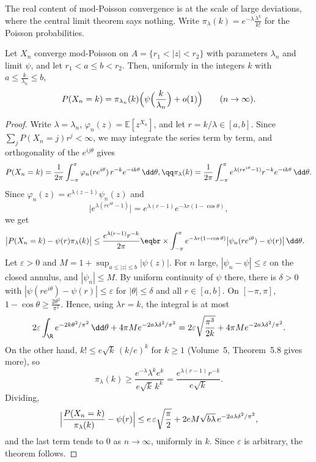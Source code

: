 The real content of mod-Poisson convergence is at the scale of large deviations, where the central limit theorem says nothing. Write $\pi_\lambda(k)=e^{-\lambda}\frac{\lambda^k}{k!}$ for the Poisson probabilities.

\begin{theorem}\label{thm:modpoissonlocal}
Let $X_n$ converge mod-Poisson on $A=\{r_1<|z|<r_2\}$ with parameters $\lambda_n$ and limit $\psi$, and let $r_1<a\le b<r_2$. Then, uniformly in the integers $k$ with $a\le\frac k{\lambda_n}\le b$,
\[
P(X_n=k)=\pi_{\lambda_n}(k)\Bigl(\psi\Bigl(\frac k{\lambda_n}\Bigr)+o(1)\Bigr)\qquad(n\to\infty).
\]
\end{theorem}
\begin{proof}
Write $\lambda=\lambda_n$, $\varphi_n(z)=\mathbb E[z^{X_n}]$, and let $r=k/\lambda\in[a,b]$. Since $\sum_jP(X_n=j)r^j<\infty$, we may integrate the series term by term, and orthogonality of the $e^{ij\theta}$ gives
\[
\begin{gathered}P(X_n=k)=\frac1{2\pi}\int_{-\pi}^\pi\varphi_n(re^{i\theta})\,r^{-k}e^{-ik\theta}\,\dd\theta,\qq\pi_\lambda(k)=\frac1{2\pi}\int_{-\pi}^\pi e^{\lambda(re^{i\theta}-1)}r^{-k}e^{-ik\theta}\,\dd\theta .\end{gathered}
\]
Since $\varphi_n(z)=e^{\lambda(z-1)}\psi_n(z)$ and
\[
\bigl|e^{\lambda(re^{i\theta}-1)}\bigr|=e^{\lambda(r-1)}e^{-\lambda r(1-\cos\theta)},
\]
we get
\[
\begin{aligned}\bigl|P(X_n=k)-\psi(r)\pi_\lambda(k)\bigr|&\le\frac{e^{\lambda(r-1)}r^{-k}}{2\pi}\eqbr\times\int_{-\pi}^\pi e^{-\lambda r(1-\cos\theta)}\bigl|\psi_n(re^{i\theta})-\psi(r)\bigr|\,\dd\theta .\end{aligned}
\]
Let $\varepsilon>0$ and $M=1+\sup_{a\le|z|\le b}|\psi(z)|$. For $n$ large, $|\psi_n-\psi|\le\varepsilon$ on the closed annulus, and $|\psi_n|\le M$. By uniform continuity of $\psi$ there, there is $\delta>0$ with $|\psi(re^{i\theta})-\psi(r)|\le\varepsilon$ for $|\theta|\le\delta$ and all
$r\in[a,b]$. On $[-\pi,\pi]$, $1-\cos\theta\ge\frac{2\theta^2}{\pi^2}$. Hence, using $\lambda r=k$, the integral is at most
\[
2\varepsilon\int_\R e^{-2k\theta^2/\pi^2}\,\dd\theta+4\pi Me^{-2a\lambda\delta^2/\pi^2}=2\varepsilon\sqrt{\frac{\pi^3}{2k}}+4\pi Me^{-2a\lambda\delta^2/\pi^2}.
\]
On the other hand, $k!\le e\sqrt k\,(k/e)^k$ for $k\ge1$ (Volume~5, Theorem~5.8 gives more), so
\[
\pi_\lambda(k)\ge\frac{e^{-\lambda}\lambda^ke^k}{e\sqrt k\,k^k}=\frac{e^{\lambda(r-1)}r^{-k}}{e\sqrt k}.
\]
Dividing,
\[
\Bigl|\frac{P(X_n=k)}{\pi_\lambda(k)}-\psi(r)\Bigr|\le e\,\varepsilon\sqrt{\frac\pi2}+2eM\sqrt{b\lambda}\,e^{-2a\lambda\delta^2/\pi^2},
\]
and the last term tends to $0$ as $n\to\infty$, uniformly in $k$. Since $\varepsilon$ is arbitrary, the theorem follows.
\end{proof}

